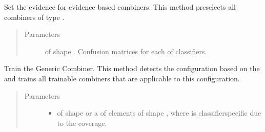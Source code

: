 \documentclass[letterpaper,10pt,english]{sphinxmanual}
\begin{document}
\begin{fulllineitems}
\begin{fulllineitems}
\begin{quote}
\begin{description}
\end{description}\end{quote}

\end{fulllineitems}


\begin{fulllineitems}
\label{\detokenize{pusion.auto.generic_combiner:pusion.auto.generic_combiner.GenericCombiner.set_evidence}}
\sphinxAtStartPar
Set the evidence for evidence based combiners. This method preselects all combiners of type
.
\begin{quote}\begin{description}
\item[{Parameters}] \leavevmode
\sphinxAtStartPar
{} \textendash{}  of shape .
Confusion matrices for each of  classifiers.

\end{description}\end{quote}

\end{fulllineitems}


\begin{fulllineitems}
\label{\detokenize{pusion.auto.generic_combiner:pusion.auto.generic_combiner.GenericCombiner.train}}
\sphinxAtStartPar
Train the Generic Combiner. This method detects the configuration based on the  and
trains all trainable combiners that are applicable to this configuration.
\begin{quote}\begin{description}
\item[{Parameters}] \leavevmode\begin{itemize}
\item {} 
\sphinxAtStartPar
{} \textendash{} 
\sphinxAtStartPar
{} of shape  or a  of
 elements of shape , where  is classifier\sphinxhyphen{}specific
due to the coverage.


\end{itemize}
\end{description}
\end{quote}
\end{fulllineitems}
\end{fulllineitems}
\end{document}
